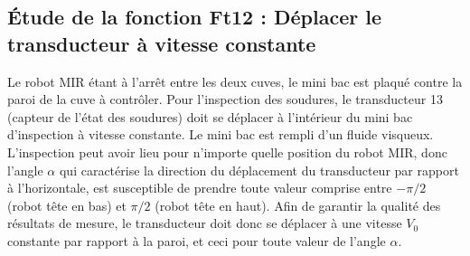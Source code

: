 %
%
%
%
%
%
%

\subsection*{Étude de la fonction Ft12 : Déplacer le transducteur à vitesse constante}
\ifcolle
\else
Le robot MIR étant à l’arrêt entre les deux cuves, le mini bac est plaqué contre la paroi de la cuve à contrôler. Pour l’inspection des soudures, le transducteur 13 (capteur de l’état des soudures) doit se déplacer à l’intérieur du mini bac d’inspection à vitesse constante. Le mini bac est rempli d’un fluide visqueux. L’inspection peut avoir lieu pour n’importe quelle position du robot MIR, donc l’angle $\alpha$ qui caractérise la direction du déplacement du transducteur par rapport à l’horizontale, est susceptible de prendre toute valeur comprise entre $-\pi/2$ (robot tête en bas) et $\pi/2$ (robot tête en haut). Afin de garantir la qualité des résultats de mesure, le transducteur doit donc se déplacer à une vitesse $V_0$ constante par rapport à la paroi, et ceci pour toute valeur de l’angle $\alpha$.
\fi


